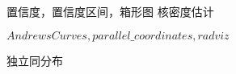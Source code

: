 \documentclass[16pt,UTF8]{ctexart}
\begin{document}
\LARGE

\indent 置信度，置信度区间，箱形图
\indent 核密度估计

\indent $Andrews Curves  ,parallel\_coordinates,radviz $

\indent 独立同分布
\end{document}
